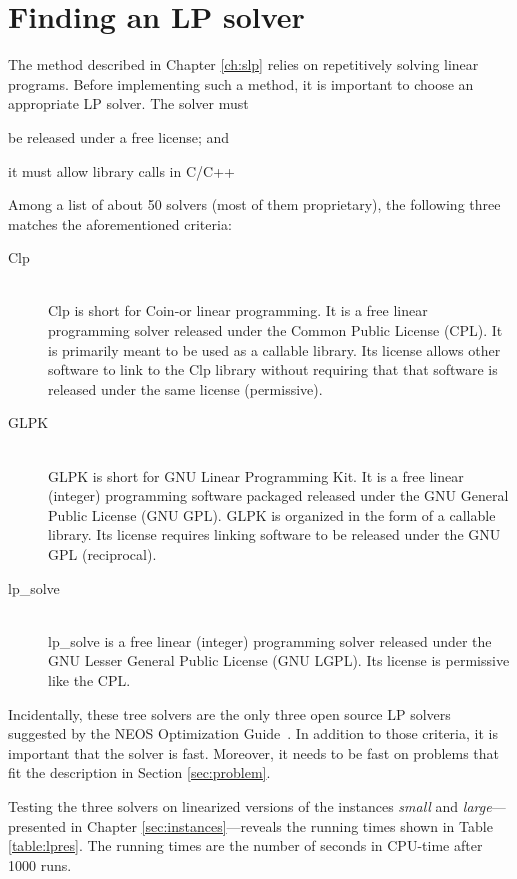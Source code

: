 \section{Finding an LP solver}
The method described in Chapter \ref{ch:slp} relies on repetitively solving
linear programs. Before implementing such a method, it is important to choose
an appropriate LP solver. The solver must
\begin{inparaenum}
\item be released under a free license; and
\item it must allow library calls in C/C++
\end{inparaenum}

Among a list of about 50 solvers (most of them proprietary), the
following three matches the aforementioned criteria:
\begin{description}
\item[Clp] \hfill \\
Clp is short for Coin-or linear programming. It is a free linear programming
solver released under the Common Public License (CPL). It is primarily meant to
be used as a callable library. Its license allows other software to link to the
Clp library without requiring that that software is released under the same
license (permissive). \cite{clp}
\item[GLPK] \hfill \\
GLPK is short for GNU Linear Programming Kit. It is a free linear (integer)
programming software packaged released under the GNU General Public License
(GNU GPL). GLPK is organized in the form of a callable library. Its license
requires linking software to be released under the GNU GPL (reciprocal).
\cite{glpk}
\item[lp\_solve] \hfill \\
lp\_solve is a free linear (integer) programming solver released under the GNU 
Lesser General Public License (GNU LGPL). Its license is permissive like the
CPL. \cite{lpsolve}
\end{description}

Incidentally, these tree solvers are the only three open source LP solvers
suggested by the NEOS Optimization Guide~\cite{neos}.
In addition to those criteria, it is important that the solver is fast.
Moreover, it needs to be fast on problems that fit the description in
Section \ref{sec:problem}.

Testing the three solvers on linearized versions of the instances
\textit{small} and \textit{large}---presented in
Chapter \ref{sec:instances}---reveals the running times shown in Table
\ref{table:lpres}.
The running times are the number of seconds in CPU-time after 1000 runs.

